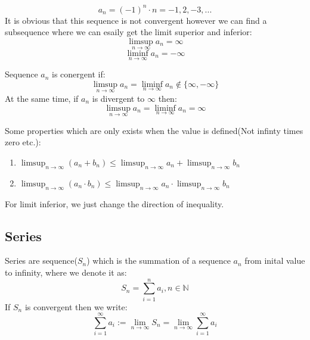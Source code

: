 \documentclass{article}
\begin{document}
\begin{example}
	\begin{equation*}
		a_n=(-1)^n\cdot n= -1,2,-3,...
	\end{equation*}
	It is obvious that this sequence is not convergent however we can find a subsequence where we can esaily get the limit superior and inferior:
	\begin{equation*}
		\limsup_{n\to \infty}a_n=\infty
	\end{equation*}
	\begin{equation*}
		\liminf_{n\to \infty}a_n=-\infty
	\end{equation*}
\end{example}

\begin{theorem}
	Sequence $a_n$ is conergent if:
	\begin{equation*}
		\limsup_{n\to \infty}a_n=\liminf_{n\to \infty}a_n \notin \{\infty,-\infty \}
	\end{equation*}
	At the same time, if $a_n$ is divergent to $\infty$ then:
	\begin{equation*}
		\limsup_{n\to \infty}a_n=\liminf_{n\to \infty}a_n=\infty
	\end{equation*}
\end{theorem}

Some properties which are only exists when the value is defined(Not infinty times zero etc.):
\begin{enumerate}
	\item $\limsup_{n\to \infty}(a_n+b_n)\leq \limsup_{n\to \infty}a_n+\limsup_{n\to \infty}b_n$
	\item $\limsup_{n\to \infty}(a_n\cdot b_n)\leq \limsup_{n\to \infty}a_n\cdot \limsup_{n\to \infty}b_n$
\end{enumerate}

For limit inferior, we just change the direction of inequality.
\clearpage
\subsection{Series}
\begin{definition}
Series are sequence($S_n$) which is the summation of a sequence $a_n$ from inital value to infinity, where we denote it as:
	\begin{equation*}
		S_n=\sum_{i=1}^n a_i,n\in \mathbb{N}
	\end{equation*}
	If $S_n$ is convergent then we write: 
	\begin{equation*}
		\sum_{i=1}^\infty a_i:=\lim_{n\to \infty} S_n=\lim_{n\to \infty}\sum_{i=1}^\infty a_i
	\end{equation*}
\end{definition}
\end{document}
